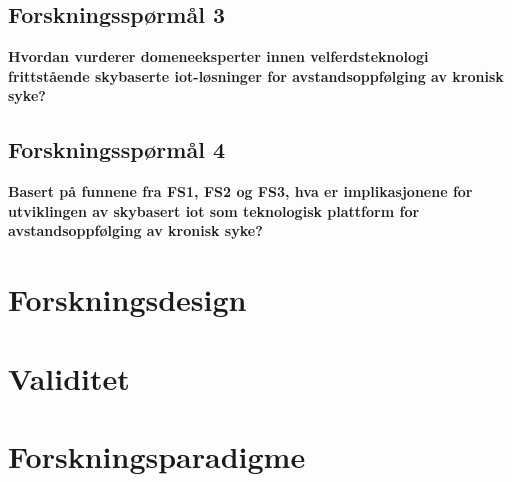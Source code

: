 \subsection{Forskningsspørmål 3}
\textbf{Hvordan vurderer domeneeksperter innen velferdsteknologi frittstående skybaserte \gls{iot}-løsninger for avstandsoppfølging av kronisk syke?}
 
\subsection{Forskningsspørmål 4}
\textbf{Basert på funnene fra FS1, FS2 og FS3, hva er implikasjonene for utviklingen av skybasert \gls{iot} som teknologisk plattform
    for avstandsoppfølging av kronisk syke?}

\section{Forskningsdesign}
\blindtext

\section{Validitet}

\section{Forskningsparadigme}